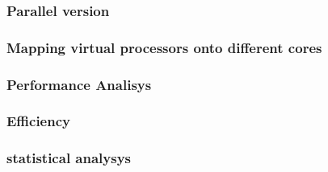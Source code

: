 \subsubsection*{Parallel version}
\subsubsection*{Mapping virtual processors onto different cores} 
\subsubsection*{Performance Analisys} 
\subsubsection*{Efficiency} 
\subsubsection*{statistical analysys}

